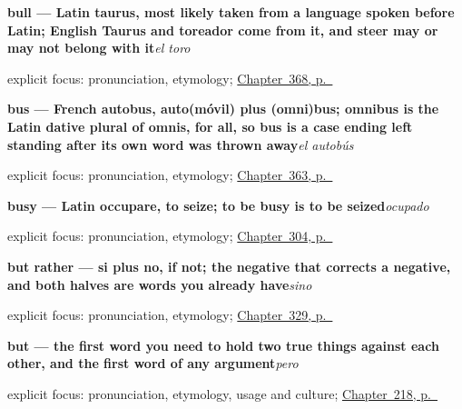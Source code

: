 \noindent\begin{minipage}[t]{\linewidth}
\raggedright
\textbf{bull — Latin taurus, most likely taken from a language spoken before Latin; English Taurus and toreador come from it, and steer may or may not belong with it}\enspace\emph{el toro}\par
\footnotesize explicit focus: pronunciation, etymology; \hyperref[ch:la-abeja-y-la-mosca]{Chapter~368, p.~\pageref*{ch:la-abeja-y-la-mosca}}
\end{minipage}\par\smallskip

\noindent\begin{minipage}[t]{\linewidth}
\raggedright
\textbf{bus — French autobus, auto(móvil) plus (omni)bus; omnibus is the Latin dative plural of omnis, for all, so bus is a case ending left standing after its own word was thrown away}\enspace\emph{el autobús}\par
\footnotesize explicit focus: pronunciation, etymology; \hyperref[ch:el-coche-y-el-avion]{Chapter~363, p.~\pageref*{ch:el-coche-y-el-avion}}
\end{minipage}\par\smallskip

\noindent\begin{minipage}[t]{\linewidth}
\raggedright
\textbf{busy — Latin occupare, to seize; to be busy is to be seized}\enspace\emph{ocupado}\par
\footnotesize explicit focus: pronunciation, etymology; \hyperref[ch:como-estoy]{Chapter~304, p.~\pageref*{ch:como-estoy}}
\end{minipage}\par\smallskip

\noindent\begin{minipage}[t]{\linewidth}
\raggedright
\textbf{but rather — si plus no, if not; the negative that corrects a negative, and both halves are words you already have}\enspace\emph{sino}\par
\footnotesize explicit focus: pronunciation, etymology; \hyperref[ch:tal-y-salvo]{Chapter~329, p.~\pageref*{ch:tal-y-salvo}}
\end{minipage}\par\smallskip

\noindent\begin{minipage}[t]{\linewidth}
\raggedright
\textbf{but — the first word you need to hold two true things against each other, and the first word of any argument}\enspace\emph{pero}\par
\footnotesize explicit focus: pronunciation, etymology, usage and culture; \hyperref[ch:pero]{Chapter~218, p.~\pageref*{ch:pero}}
\end{minipage}\par\smallskip

